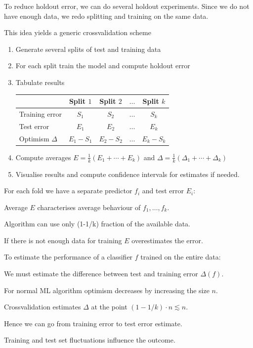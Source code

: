 \documentclass[landscape,footrule]{foils}
\begin{document}
\enlargethispage{0.7cm}

To reduce holdout error, we can do several holdout experiments. 
Since we do not have enough data, we redo splitting and training on the same data. 

This idea yields a generic crossvalidation scheme
\begin{enumerate}
\item Generate several splits of test and training data
\item For each split train the model and compute holdout error
\item Tabulate results\vspace*{2ex}
\begin{center}
\begin{tabular}{|l|c|c|c|c|}
\hline
 & Split $1$ & Split $2$ & $\ldots$ & Split $k$\\
 \hline
 Training error & $S_1$ & $S_2$ & $\ldots$ & $S_k$\\
 Test error     & $E_1$ & $E_2$ & $\ldots$ & $E_k$\\
\hline
 Optimism $\Delta$    & $E_1-S_1$ & $E_2-S_2$ & $\ldots$ & $E_k-S_k$\\
 \cline{2-5}
\hline
\end{tabular}
\end{center}
\vspace*{2ex}
\item Compute averages $E=\frac{1}{k}(E_1+\cdots+E_k)$ and $\Delta=\frac{1}{k}(\Delta_1+\cdots+\Delta_k)$
\item Visualise results and compute confidence intervals for estimates if needed. 
\end{enumerate}



For each fold we have a separate predictor $f_i$ and test error $E_i$:
\begin{triangles}
\item Average $E$ characterises average behaviour of $f_1,\ldots, f_k$.
\item Algorithm can use only (1-1/k) fraction of the available data.
\item If there is not enough data for training $E$ overestimates the error. \vspace*{1cm}  
\end{triangles}

To estimate the performance of a classifier $f$ trained on the entire data:
\begin{triangles}
\item We must estimate the difference between test and training error $\Delta(f)$.
\item For normal ML algorithm optimism decreases by increasing the size $n$.
\item Crossvalidation estimates $\Delta$ at the point $(1-1/k)\cdot n \lesssim n$. 
\item Hence we can go from training error to test error estimate.
\item Training and test set fluctuations influence the outcome.  
\end{triangles}
 
\end{document}
